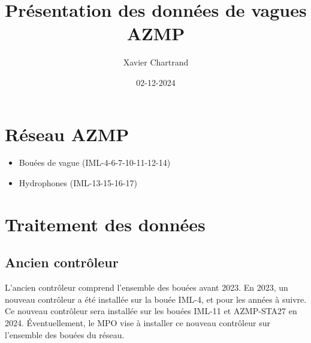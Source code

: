 \documentclass[12pt]{article}
\author{Xavier Chartrand}
\date{02-12-2024}
\title{Présentation des données de vagues AZMP}
\numberwithin{equation}{section}
\numberwithin{table}{section}
\numberwithin{figure}{section}
\begin{document}
\maketitle
\tableofcontents


\section{Réseau AZMP}
\label{sec:orgc1fd6bc}
\begin{figure}[H]
\centering
{}
\caption{}
\end{figure}

\begin{itemize}
\item Bouées de vague (IML-4-6-7-10-11-12-14) \\
\item Hydrophones (IML-13-15-16-17)
\end{itemize}

\section{Traitement des données}
\label{sec:org71bb02a}
\subsection{Ancien contrôleur}
\label{sec:org8a81260}
L'ancien contrôleur comprend l'ensemble des bouées avant 2023. En 2023, un
nouveau contrôleur a été installée sur la bouée IML-4, et pour les années à
suivre. Ce nouveau contrôleur sera installée sur les bouées IML-11 et
AZMP-STA27 en 2024. Éventuellement, le MPO vise à installer ce nouveau
contrôleur sur l'ensemble des bouées du réseau.
\end{document}
